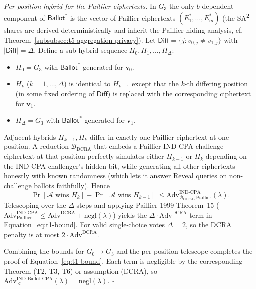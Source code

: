 \emph{Per-position hybrid for the Paillier ciphertexts.} In $G_3$ the only $b$-dependent component of $\mathsf{Ballot}^*$ is the vector of Paillier ciphertexts $(E_1^*, \ldots, E_m^*)$ (the SA\textsuperscript{2} shares are derived deterministically and inherit the Paillier hiding analysis, cf. Theorem~\ref{subsubsec:t5-aggregation-privacy}). Let $\mathsf{Diff} = \{j : v_{0,j} \neq v_{1,j}\}$ with $|\mathsf{Diff}| = \Delta$. Define a sub-hybrid sequence $H_0, H_1, \ldots, H_\Delta$:
\begin{itemize}
    \item $H_0 = G_3$ with $\mathsf{Ballot}^*$ generated for $\mathbf{v}_0$.
    \item $H_k$ ($k = 1, \ldots, \Delta$) is identical to $H_{k-1}$ except that the $k$-th differing position (in some fixed ordering of $\mathsf{Diff}$) is replaced with the corresponding ciphertext for $\mathbf{v}_1$.
    \item $H_\Delta = G_3$ with $\mathsf{Ballot}^*$ generated for $\mathbf{v}_1$.
\end{itemize}
Adjacent hybrids $H_{k-1}, H_k$ differ in exactly one Paillier ciphertext at one position. A reduction $\mathcal{B}_{\mathrm{DCRA}}$ that embeds a Paillier IND-CPA challenge ciphertext at that position perfectly simulates either $H_{k-1}$ or $H_k$ depending on the IND-CPA challenger's hidden bit, while generating all other ciphertexts honestly with known randomness (which lets it answer Reveal queries on non-challenge ballots faithfully). Hence
\begin{equation*}
    |\Pr[\mathcal{A} \text{ wins } H_k] - \Pr[\mathcal{A} \text{ wins } H_{k-1}]| \leq \mathrm{Adv}^{\mathrm{IND\text{-}CPA}}_{\mathcal{B}_{\mathrm{DCRA}}, \mathrm{Paillier}}(\lambda).
\end{equation*}
Telescoping over the $\Delta$ steps and applying Paillier 1999 Theorem~15 ($\mathrm{Adv}^{\mathrm{IND\text{-}CPA}}_{\mathrm{Paillier}} \leq \mathrm{Adv}^{\mathrm{DCRA}} + \mathrm{negl}(\lambda)$) yields the $\Delta \cdot \mathrm{Adv}^{\mathrm{DCRA}}$ term in Equation~\eqref{eq:t1-bound}. For valid single-choice votes $\Delta = 2$, so the DCRA penalty is at most $2 \cdot \mathrm{Adv}^{\mathrm{DCRA}}$.

Combining the bounds for $G_0 \to G_3$ and the per-position telescope completes the proof of Equation~\eqref{eq:t1-bound}. Each term is negligible by the corresponding Theorem (T2, T3, T6) or assumption (DCRA), so $\mathrm{Adv}^{\mathrm{IND\text{-}Ballot\text{-}CPA}}_{\mathcal{A}}(\lambda) = \mathrm{negl}(\lambda)$. \hfill $\square$

